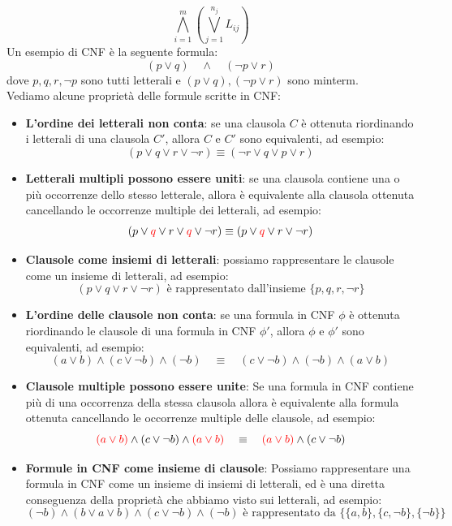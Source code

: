 \[    \bigwedge_{i = 1}^{m} \left( \bigvee_{j = 1}^{n_j} L_{ij}  \right)   \]
Un esempio di CNF è la seguente formula:
\[      (p\lor q)   \quad    \land    \quad    (\neg p\lor r)         \]
dove $p,q,r,\neg p$ sono tutti letterali e $(p \vee q ), (\neg p \vee r)$ sono minterm.\smallskip\\
Vediamo alcune proprietà delle formule scritte in CNF:
\begin{itemize}
    \item \textbf{L'ordine dei letterali non conta}: se una clausola $C$ è ottenuta riordinando 
    i letterali di una clausola $C'$, allora $C$ e $C'$ sono equivalenti, ad esempio:
    \[   (p \vee q \vee r \vee \neg r) \equiv (\neg r \vee q \vee p \vee r)      \]
    \item \textbf{Letterali multipli possono essere uniti}: se una clausola contiene una o più occorrenze dello stesso 
    letterale, allora è equivalente alla clausola ottenuta cancellando le occorrenze multiple dei letterali, ad esempio:
    \[   (p \vee \textcolor{red}{q}\vee r \vee \textcolor{red}{q} \vee \neg r) \equiv (p \vee \textcolor{red}{q} \vee r \vee \neg r)    \]
    \item \textbf{Clausole come insiemi di letterali}: possiamo rappresentare le clausole come un insieme di letterali, ad esempio:
    \[  (p \vee q \vee r \vee \neg r) \text{ è rappresentato dall'insieme } \{ p,q,r,\neg r   \}  \] 
    \item \textbf{L'ordine delle clausole non conta}: se una formula in CNF $\phi$ è ottenuta riordinando le clausole 
     di una formula in CNF $\phi'$, allora $\phi$ e $\phi'$ sono equivalenti, ad esempio:
    \[   (a \vee b) \wedge (c \vee \neg b) \wedge (\neg b) \quad \equiv \quad (c \vee \neg b) \wedge  (\neg b) \wedge (a \vee b) \]
    \item \textbf{Clausole multiple possono essere unite}: Se una formula in CNF contiene più di una occorrenza della stessa clausola 
    allora è equivalente alla formula ottenuta cancellando le occorrenze multiple delle clausole, ad esempio:
    \[   \mathcolor{red}{(a \vee b)} \wedge (c \vee \neg b) \wedge \mathcolor{red}{(a \vee b)}\quad \equiv \quad \mathcolor{red}{(a \vee b)} \wedge (c \vee \neg b)    \]
    \item \textbf{Formule in CNF come insieme di clausole}: Possiamo rappresentare una formula in CNF come un 
    insieme di insiemi di letterali, ed è una diretta conseguenza della proprietà che abbiamo visto sui letterali,
    ad esempio:
    \[  (\neg b) \wedge (b \vee a \vee b) \wedge (c \vee \neg b) \wedge (\neg b)  \text{ è rappresentato da }   \big\{\{a, b\}, \{c, ¬b\}, \{¬b\}\big\}   \]
\end{itemize}



